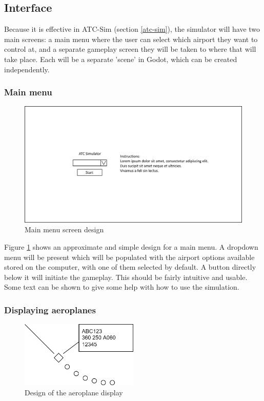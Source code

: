 \documentclass{article}
\begin{document}
\subsection{Interface}
Because it is effective in ATC-Sim (section \ref{atc-sim}), the simulator will have two main screens: a main menu where the user can select which airport they want to control at, and a separate gameplay screen they will be taken to where that will take place.
Each will be a separate 'scene' in Godot, which can be created independently.

\subsubsection{Main menu}
\begin{figure}[H]
\centering
\includegraphics[width=\textwidth]{diagrams/mainmenu.png}
\caption{\label{fig:main_menu_design}Main menu screen design}
\end{figure}

Figure \ref{fig:main_menu_design} shows an approximate and simple design for a main menu.
A dropdown menu will be present which will be populated with the airport options available stored on the computer, with one of them selected by default.
A button directly below it will initiate the gameplay.
This should be fairly intuitive and usable.
Some text can be shown to give some help with how to use the simulation.

\subsubsection{Displaying aeroplanes}
\begin{figure}[H]
\centering
\includegraphics[width=0.5\textwidth]{diagrams/aeroplane_design.png}
\caption{\label{fig:aeroplane_design}Design of the aeroplane display}
\end{figure}
\end{document}

